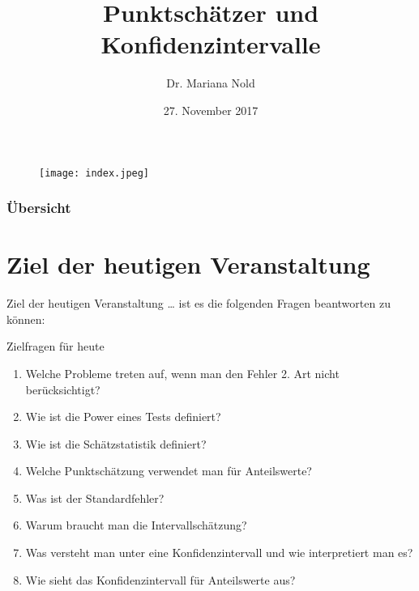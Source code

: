 \documentclass[usenames,dvipsnames,handout]{beamer}
\begin{document}
\author[Dr. Mariana Nold]{Dr. Mariana Nold}
 \date{}
\title [Punktschätzer und Konfidenzintervalle ]{Punktschätzer und Konfidenzintervalle }
\date{27. November 2017}
\begin{frame}
\maketitle

  \begin{figure}[ht]
 	\centering
 	      \texttt{[image: index.jpeg]}
 	\end{figure}
\end{frame} 

\begin{frame}
  \frametitle{Übersicht}
  \tableofcontents
\end{frame}






\section{Ziel der heutigen Veranstaltung}
\begin{frame}{Ziel der heutigen Veranstaltung \dots}
ist es die folgenden Fragen beantworten zu können:
\begin{block}{Zielfragen für heute}
\begin{enumerate}
\item{Welche Probleme treten auf, wenn man den Fehler 2. Art nicht berücksichtigt?}
\item{Wie ist die Power eines Tests definiert?}
\item{Wie ist die Schätzstatistik definiert?}
\item{Welche Punktschätzung verwendet man für Anteilswerte?}
\item{Was ist der Standardfehler?}
\item{Warum braucht man die Intervallschätzung?}
\item{Was versteht man unter eine Konfidenzintervall und wie interpretiert man es?}
\item{Wie sieht das Konfidenzintervall für Anteilswerte aus?}
\end{enumerate}
\end{block}
\end{frame}
\end{document}
